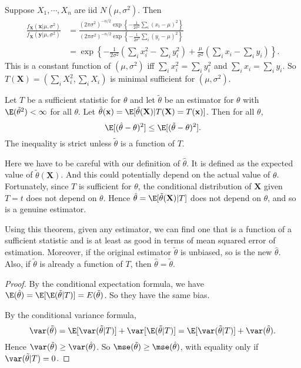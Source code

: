 \documentclass[a4paper]{article}
\begin{document}
\begin{eg}
  Suppose $X_1, \cdots, X_n$ are iid $N(\mu, \sigma^2)$. Then
  \begin{align*}
    \frac{f_\mathbf{X}(\mathbf{x}|\mu, \sigma^2)}{f_\mathbf{X}(\mathbf{y}|\mu, \sigma^2)} &= \frac{(2\pi\sigma^2)^{-n/2}\exp\left\{-\frac{1}{2\sigma^2}\sum_i(x_i - \mu)^2\right\}}{(2\pi\sigma^2)^{-n/2}\exp\left\{-\frac{1}{2\sigma^2}\sum_i(y_i - \mu)^2\right\}}\\
    &=\exp\left\{-\frac{1}{2\sigma^2}\left(\sum_i x_i^2 - \sum_i y_i^2\right) + \frac{\mu}{\sigma^2}\left(\sum_{i}x_i - \sum_i y_i\right)\right\}.
  \end{align*}
  This is a constant function of $(\mu, \sigma^2)$ iff  $\sum_i x_i^2 = \sum_i y_i^2$ and $\sum_i x_i = \sum_i y_i$. So $T(\mathbf{X}) = (\sum_i X_i^2, \sum_i X_i)$ is minimal sufficient for $(\mu, \sigma^2)$.
\end{eg}

\begin{thm}
  Let $T$ be a sufficient statistic for $\theta$ and let $\tilde{\theta}$ be an estimator for $\theta$ with $\E(\tilde{\theta}^2) < \infty$ for all $\theta$. Let $\hat{\theta}(\mathbf{x}) = \E[\tilde{\theta}(\mathbf{X})|T(\mathbf{X}) = T(\mathbf{x})]$. Then for all $\theta$,
  \[
    \E[(\hat{\theta} - \theta)^2] \leq \E[(\tilde{\theta} - \theta)^2].
  \]
  The inequality is strict unless $\tilde{\theta}$ is a function of $T$.
\end{thm}
Here we have to be careful with our definition of $\hat{\theta}$. It is defined as the expected value of $\tilde{\theta}(\mathbf{X})$. And this could potentially depend on the actual value of $\theta$. Fortunately, since $T$ is sufficient for $\theta$, the conditional distribution of $\mathbf{X}$ given $T = t$ does not depend on $\theta$. Hence $\hat{\theta} = \E[\tilde{\theta}(\mathbf{X})|T]$ does not depend on $\theta$, and so is a genuine estimator.

Using this theorem, given any estimator, we can find one that is a function of a sufficient statistic and is at least as good in terms of mean squared error of estimation. Moreover, if the original estimator $\tilde{\theta}$ is unbiased, so is the new $\hat{\theta}$. Also, if $\tilde{\theta}$ is already a function of $T$, then $\hat{\theta} = \tilde{\theta}$.

\begin{proof}
  By the conditional expectation formula, we have $\E(\hat{\theta}) = \E[\E(\tilde{\theta}|T)] = E(\tilde{\theta})$. So they have the same bias.

  By the conditional variance formula,
  \[
    \var(\tilde{\theta}) = \E[\var (\tilde{\theta}|T)] + \var [\E(\tilde{\theta}|T)] = \E[\var(\tilde{\theta}|T)] + \var(\hat{\theta}).
  \]
  Hence $\var(\tilde{\theta}) \geq \var (\hat{\theta})$. So $\mse(\tilde{\theta}) \geq \mse(\hat{\theta})$, with equality only if $\var(\tilde{\theta}|T) = 0$.
\end{proof}
\end{document}
